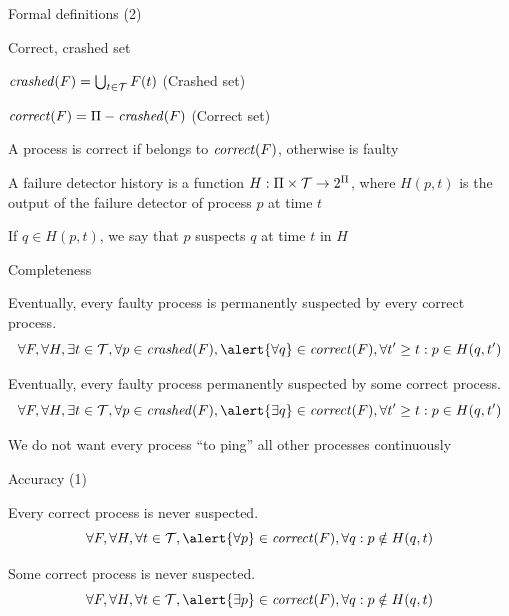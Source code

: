 \begin{frame}{Formal definitions (2)}

\begin{definition}{Correct, crashed set}
\BI
\item $\mathit{crashed}(F) = \bigcup_{t \in {\cal T}} F(t)$ (\alert{Crashed set})
\item $\mathit{correct}(F) = \Pi - \mathit{crashed}(F)$ (\alert{Correct set}) 
\item A process is \alert{correct} if belongs to $\mathit{correct}(F)$, otherwise is \alert{faulty}
\EI
\end{definition}


\begin{definition}
A \alert{failure detector history} is a function $H: \Pi \times {\cal T} \rightarrow 2^\Pi$,
where $H(p,t)$ is the output of the failure detector of process $p$ at time $t$
\BI
\item If $q \in H(p, t)$, we say that $p$ \alert{suspects} $q$ at time $t$ in $H$
\EI
\end{definition}	
	
\end{frame}


\begin{frame}{Completeness}
	
\begin{definition}
Eventually, every faulty process is permanently suspected by \alert{every} correct process.	
\[
\forall F, \forall H, \exists t \in {\cal T}, \forall p \in \Crashed(F), \alert{\forall q} \in \Correct(F), \forall t' \geq t : p \in H(q,t')
\]
\end{definition}
	
\begin{definition}
Eventually, every faulty process permanently suspected by \alert{some} correct process.	
\[
\forall F, \forall H, \exists t \in {\cal T}, \forall p \in \Crashed(F), \alert{\exists q} \in \Correct(F), \forall t' \geq t : p \in H(q,t')
\]
\end{definition}
	
\bigskip
{}

We do not want every process “to ping” all other processes continuously

\end{frame}
 	
\begin{frame}{Accuracy (1)}

\begin{definition}
\alert{Every} correct process is never suspected.
\[
\forall F, \forall H, \forall t \in {\cal T}, \alert{\forall p} \in \Correct(F), \forall q : p \notin H(q, t)
\]
\end{definition}

\begin{definition}
\alert{Some} correct process is never suspected.
\[
\forall F, \forall H, \forall t \in {\cal T},\alert{ \exists p} \in \Correct(F), \forall q : p \notin H(q, t)
\]
\end{definition}
	
	
\end{frame}

